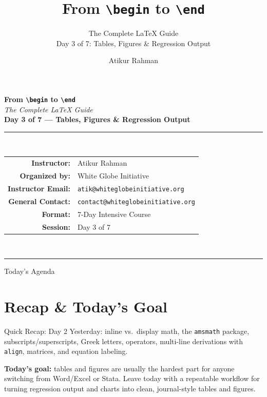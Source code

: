 \documentclass[11pt,aspectratio=169]{beamer}
\title[\texttt{\textbackslash begin} to \texttt{\textbackslash end}]{From \texttt{\textbackslash begin} to \texttt{\textbackslash end}}
\subtitle{The Complete LaTeX Guide \\[2pt] \normalsize Day 3 of 7: Tables, Figures \& Regression Output}
\author[A.\ Rahman]{Atikur Rahman}
\institute[White Globe Initiative]{White Globe Initiative}
\begin{document}
\begin{frame}[plain]
  \begin{center}
    \vspace{4pt}
    {\Huge\bfseries{}From \texttt{\textbackslash begin} to \texttt{\textbackslash end}}\\[6pt]
    {\Large\itshape The Complete LaTeX Guide}\\[18pt]
    {\large\bfseries Day 3 of 7 --- Tables, Figures \& Regression Output}\\[22pt]
    \rule{0.7\textwidth}{0.4pt}\\[14pt]
    \begin{tabular}{rl}
      \textbf{Instructor:}       & Atikur Rahman \\[3pt]
      \textbf{Organized by:}     & White Globe Initiative \\[3pt]
      \textbf{Instructor Email:} & \texttt{atik@whiteglobeinitiative.org} \\[3pt]
      \textbf{General Contact:}  & \texttt{contact@whiteglobeinitiative.org} \\[3pt]
      \textbf{Format:}           & 7-Day Intensive Course \\[3pt]
      \textbf{Session:}          & Day 3 of 7 \\
    \end{tabular}\\[18pt]
    \rule{0.7\textwidth}{0.4pt}
  \end{center}
\end{frame}

\begin{frame}{Today's Agenda}
  \tableofcontents
\end{frame}

\section{Recap \& Today's Goal}

\begin{frame}{Quick Recap: Day 2}
  \small
  Yesterday: inline vs.\ display math, the \texttt{amsmath} package,
  subscripts/superscripts, Greek letters, operators, multi-line
  derivations with \texttt{align}, matrices, and equation labeling.
  \vspace{6pt}

  \textbf{Today's goal:} tables and figures are usually the hardest
  part for anyone switching from Word/Excel or Stata. Leave today with
  a repeatable workflow for turning regression output and charts into
  clean, journal-style tables and figures.
\end{frame}
\end{document}
